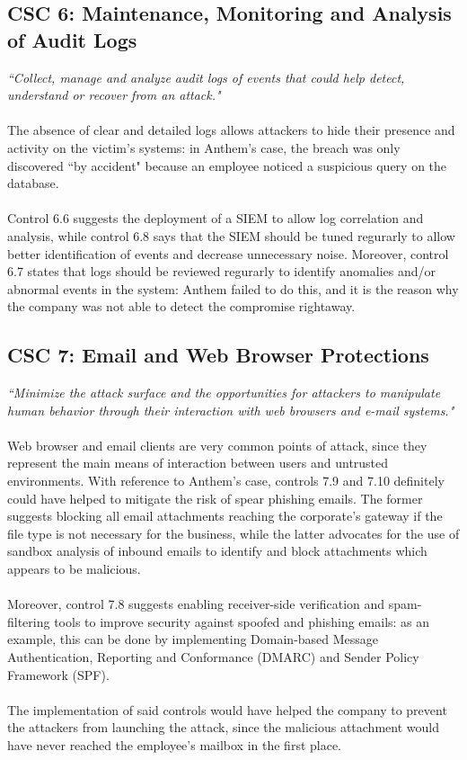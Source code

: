 	\subsection{CSC 6: Maintenance, Monitoring and Analysis of Audit Logs}
	\textit{``Collect, manage and analyze audit logs of events that could help detect, understand or recover from an attack."}\\\\
	The absence of clear and detailed logs allows attackers to hide their presence and activity on the victim's systems: in Anthem's case, the breach was only discovered ``by accident" because an employee noticed a suspicious query on the database.\\\\ Control 6.6 suggests the deployment of a SIEM to allow log correlation and analysis, while control 6.8 says that the SIEM should be tuned regurarly to allow better identification of events and decrease unnecessary noise. Moreover, control 6.7 states that logs should be reviewed regurarly to identify anomalies and/or abnormal events in the system: Anthem failed to do this, and it is the reason why the company was not able to detect the compromise rightaway.
	
	\subsection{CSC 7: Email and Web Browser Protections}
	\textit{``Minimize the attack surface and the opportunities for attackers to manipulate human behavior through their interaction with web browsers and e-mail systems."}\\\\
	Web browser and email clients are very common points of attack, since they represent the main means of interaction between users and untrusted environments. With reference to Anthem's case, controls 7.9 and 7.10 definitely could have helped to mitigate the risk of spear phishing emails. The former suggests blocking all email attachments reaching the corporate's gateway if the file type is not necessary for the business, while the latter advocates for the use of sandbox analysis of inbound emails to identify and block attachments which appears to be malicious.\\\\
	Moreover, control 7.8 suggests enabling receiver-side verification and spam-filtering tools to improve security against spoofed and phishing emails: as an example, this can be done by implementing Domain-based Message Authentication, Reporting and Conformance (DMARC) and Sender Policy Framework (SPF).\\\\
	The implementation of said controls would have helped the company to prevent the attackers from launching the attack, since the malicious attachment would have never reached the employee's mailbox in the first place.
